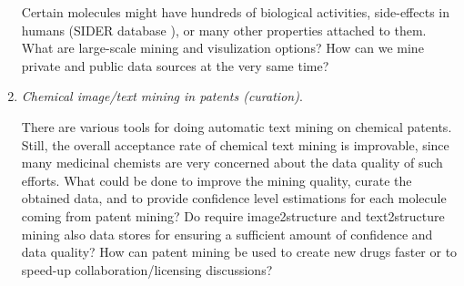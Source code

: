 \documentclass{sig-alternate}
\begin{document}
\begin{enumerate}
Certain molecules might have hundreds of biological activities, side-effects in humans (SIDER database \cite{Kuhn_Campillos_Letunic_Jensen_Bork_2010}), or
many other properties attached to them. What are large-scale mining and visulization options? 
How can we mine private and public data sources at the very same time?
%
\item \emph{Chemical image/text mining in patents (curation)}.

There are various tools for doing automatic text mining on chemical patents. Still, the overall acceptance rate of chemical
text mining is improvable, since many medicinal chemists are very concerned about the data quality of such efforts. 
What could be done to improve the mining quality, curate the obtained data, and to provide confidence level estimations 
for each molecule coming from patent mining? Do require image2structure and text2structure mining also data stores
for ensuring a sufficient amount of confidence and data quality?
How can patent mining be used to create new drugs faster or to speed-up collaboration/licensing discussions?
\end{enumerate}
\end{document}

